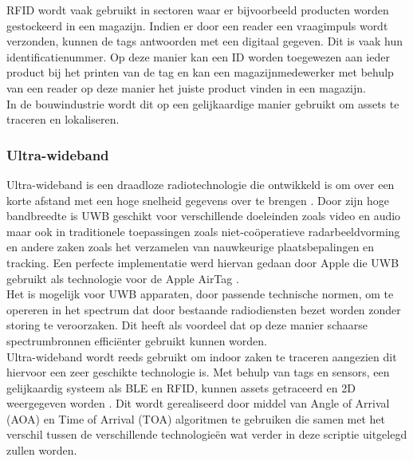 RFID wordt vaak gebruikt in sectoren waar er bijvoorbeeld producten worden gestockeerd in een magazijn. Indien er door een reader een vraagimpuls wordt verzonden, kunnen de tags antwoorden met een digitaal gegeven. Dit is vaak hun identificatienummer. Op deze manier kan een ID worden toegewezen aan ieder product bij het printen van de tag en kan een magazijnmedewerker met behulp van een reader op deze manier het juiste product vinden in een magazijn.\\

In de bouwindustrie wordt dit op een gelijkaardige manier gebruikt om assets te traceren en lokaliseren.\\

\subsubsection{Ultra-wideband}

Ultra-wideband is een draadloze radiotechnologie die ontwikkeld is om over een korte afstand met een hoge snelheid gegevens over te brengen \autocite{Rahayu2008}. Door zijn hoge bandbreedte is UWB geschikt voor verschillende doeleinden zoals video en audio maar ook in traditionele toepassingen zoals niet-coöperatieve radarbeeldvorming en andere zaken zoals het verzamelen van nauwkeurige plaatsbepalingen en tracking. Een perfecte implementatie werd hiervan gedaan door Apple die UWB gebruikt als technologie voor de Apple AirTag \autocite{Griffith2021}.\\

 Het is mogelijk voor UWB apparaten, door passende technische normen, om te opereren in het spectrum dat door bestaande radiodiensten bezet worden zonder storing te veroorzaken. Dit heeft als voordeel dat op deze manier schaarse spectrumbronnen efficiënter gebruikt kunnen worden.\\

Ultra-wideband wordt reeds gebruikt om indoor zaken te traceren aangezien dit hiervoor een zeer geschikte technologie is. Met behulp van tags en sensors, een gelijkaardig systeem als BLE en RFID, kunnen assets getraceerd en 2D weergegeven worden \autocite{Siddiqui2019}. Dit wordt gerealiseerd door middel van Angle of Arrival (AOA) en Time of Arrival (TOA) algoritmen te gebruiken die samen met het verschil tussen de verschillende technologieën wat verder in deze scriptie uitgelegd zullen worden.

